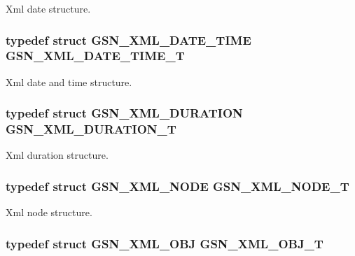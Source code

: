 Xml date structure. 

\hypertarget{a00679_ga6a6787f5abff9dee0723c437f3ce3fb4}{
\subsubsection[{GSN\_\-XML\_\-DATE\_\-TIME\_\-T}]{\setlength{\rightskip}{0pt plus 5cm}typedef struct {\bf GSN\_\-XML\_\-DATE\_\-TIME} {\bf GSN\_\-XML\_\-DATE\_\-TIME\_\-T}}}
\label{a00679_ga6a6787f5abff9dee0723c437f3ce3fb4}


Xml date and time structure. 

\hypertarget{a00679_ga86881eeaa017b4544baa061c52d6cd63}{
\subsubsection[{GSN\_\-XML\_\-DURATION\_\-T}]{\setlength{\rightskip}{0pt plus 5cm}typedef struct {\bf GSN\_\-XML\_\-DURATION} {\bf GSN\_\-XML\_\-DURATION\_\-T}}}
\label{a00679_ga86881eeaa017b4544baa061c52d6cd63}


Xml duration structure. 

\hypertarget{a00679_gafab64ea302554cb05912c7c04d943fe8}{
\subsubsection[{GSN\_\-XML\_\-NODE\_\-T}]{\setlength{\rightskip}{0pt plus 5cm}typedef struct {\bf GSN\_\-XML\_\-NODE} {\bf GSN\_\-XML\_\-NODE\_\-T}}}
\label{a00679_gafab64ea302554cb05912c7c04d943fe8}


Xml node structure. 

\hypertarget{a00679_ga158eab6806ea5fb00bc315226103c20a}{
\subsubsection[{GSN\_\-XML\_\-OBJ\_\-T}]{\setlength{\rightskip}{0pt plus 5cm}typedef struct {\bf GSN\_\-XML\_\-OBJ} {\bf GSN\_\-XML\_\-OBJ\_\-T}}}
\label{a00679_ga158eab6806ea5fb00bc315226103c20a}


